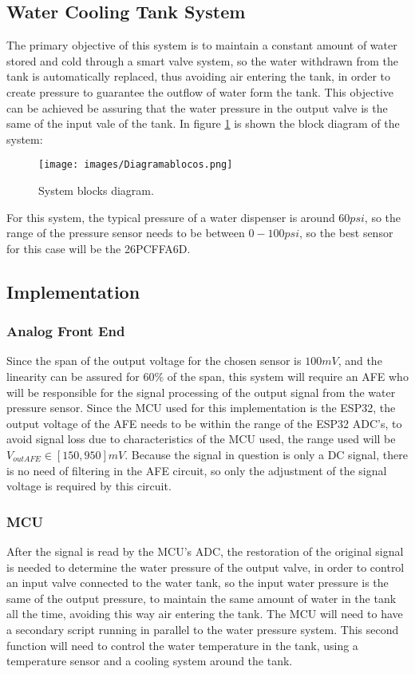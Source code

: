 \subsection{Water Cooling Tank System}

The primary objective of this system is to maintain a constant amount of water stored and cold through a smart valve system, so the water withdrawn from the tank is automatically replaced, thus avoiding air entering the tank, in order to create pressure to guarantee the outflow of water form the tank. This objective can be achieved be assuring that the water pressure in the output valve is the same of the input vale of the tank. In figure \ref{DiagramaBlocos} is shown the block diagram of the system:

\begin{figure}[H]
    \centering
    \texttt{[image: images/Diagramablocos.png]}
    \caption{System blocks diagram.} 
    \label{DiagramaBlocos}   
\end{figure}

For this system, the typical pressure of a water dispenser is around $60 psi$, so the range of the pressure sensor needs to be between $0-100 psi$, so the best sensor for this case will be the 26PCFFA6D.

\subsection{Implementation}

\subsubsection{Analog Front End}
Since the span of the output voltage for the chosen sensor is $100 mV$, and the linearity can be assured for $60\%$ of the span, this system will require an AFE who will be responsible for the signal processing of the output signal from the water pressure sensor. Since the MCU used for this implementation is the ESP32, the output voltage of the AFE needs to be within the range of the ESP32 ADC's, to avoid signal loss due to characteristics of the MCU used, the range used will be $V_{outAFE} \in [150, 950] mV$. Because the signal in question is only a DC signal, there is no need of filtering in the AFE circuit, so only the adjustment of the signal voltage is required by this circuit.

\subsubsection{MCU}

After the signal is read by the MCU's ADC, the restoration of the original signal is needed to determine the water pressure of the output valve, in order to control an input valve connected to the water tank, so the input water pressure is the same of the output pressure, to maintain the same amount of water in the tank all the time, avoiding this way air entering the tank. The MCU will need to have a secondary script running in parallel to the water pressure system. This second function will need to control the water temperature in the tank, using a temperature sensor and a cooling system around the tank.
